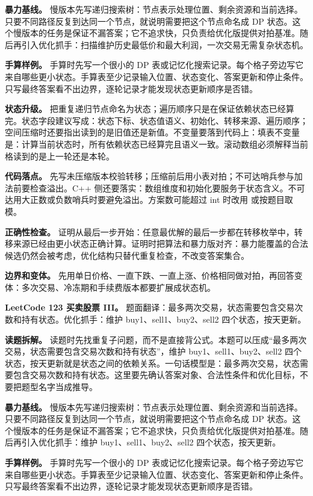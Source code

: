 \textbf{暴力基线。} 慢版本先写递归搜索树：节点表示处理位置、剩余资源和当前选择。只要不同路径反复到达同一个节点，就说明需要把这个节点命名成 DP 状态。这个慢版本的任务是保证不漏答案；它不追求快，只负责给优化版提供对拍基准。随后再引入优化抓手：扫描维护历史最低价和最大利润，一次交易无需复杂状态机。

\textbf{手算样例。} 手算时先写一个很小的 DP 表或记忆化搜索记录。每个格子旁边写它来自哪些更小状态。手算表至少记录输入位置、状态变化、答案更新和停止条件。只写最终答案看不出边界，逐轮记录才能发现状态更新顺序是否错。

\textbf{状态升级。} 把重复递归节点命名为状态；遍历顺序只是在保证依赖状态已经算完。状态字段建议写成：状态下标、状态值语义、初始化、转移来源、遍历顺序；空间压缩时还要指出读到的是旧值还是新值。不变量要落到代码上：填表不变量是：计算当前状态时，所有依赖状态已经算完且语义一致。滚动数组必须解释当前格读到的是上一轮还是本轮。

\textbf{代码落点。} 先写未压缩版本校验转移；压缩前后用小表对拍；不可达哨兵参与加法前要检查溢出。C++ 侧还要落实：数组维度和初始化要服务于状态含义。不可达用大正数或负数哨兵时要避免溢出。方案数可能超过 int 时改用  或按题目取模。

\textbf{正确性检查。} 证明从最后一步开始：任意最优解的最后一步都在转移枚举中，转移来源已经由更小状态正确计算。证明时把算法和暴力版对齐：暴力能覆盖的合法候选仍然会被考虑，优化结构只替代重复检查，不改变答案集合。

\textbf{边界和变体。} 先用单日价格、一直下跌、一直上涨、价格相同做对拍，再回答变体：多次交易、冷冻期和手续费版本都要扩展成状态机。

\noindent\textbf{LeetCode 123 买卖股票 III。} 题面翻译：最多两次交易，状态需要包含交易次数和持有状态。优化抓手：维护 buy1、sell1、buy2、sell2 四个状态，按天更新。

\textbf{读题拆解。} 读题时先找重复子问题，而不是直接背公式。本题可以压成“最多两次交易，状态需要包含交易次数和持有状态”，维护 buy1、sell1、buy2、sell2 四个状态，按天更新就是状态之间的依赖关系。一句话模型是：最多两次交易，状态需要包含交易次数和持有状态。这里要先确认答案对象、合法性条件和优化目标，不要把题型名字当成推导。

\textbf{暴力基线。} 慢版本先写递归搜索树：节点表示处理位置、剩余资源和当前选择。只要不同路径反复到达同一个节点，就说明需要把这个节点命名成 DP 状态。这个慢版本的任务是保证不漏答案；它不追求快，只负责给优化版提供对拍基准。随后再引入优化抓手：维护 buy1、sell1、buy2、sell2 四个状态，按天更新。

\textbf{手算样例。} 手算时先写一个很小的 DP 表或记忆化搜索记录。每个格子旁边写它来自哪些更小状态。手算表至少记录输入位置、状态变化、答案更新和停止条件。只写最终答案看不出边界，逐轮记录才能发现状态更新顺序是否错。


